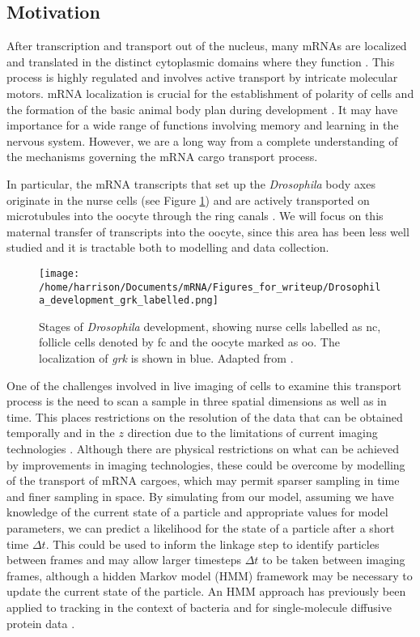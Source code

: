 \documentclass[twocolumn]{biophys}
\begin{document}
\subsection{Motivation}
After transcription and transport out of the nucleus, many mRNAs are localized and translated in the distinct cytoplasmic domains where they function \citep{jansen2001mrna, parton2014subcellular}.
This process is highly regulated and involves active transport by intricate molecular motors.
mRNA localization is crucial for the establishment of polarity of cells and the formation of the basic animal body plan during development \citep{wolpert1998}. 
It may have importance for a wide range of functions involving memory and learning in the nervous system. 
However, we are a long way from a complete understanding of the mechanisms governing the mRNA cargo transport process.

In particular, the mRNA transcripts that set up the \textit{Drosophila} body axes originate in the nurse cells (see Figure \ref{FIG:Drosophila_development}) and are actively transported on microtubules into the oocyte through the ring canals \citep{clark2007dynein}.
We will focus on this maternal transfer of transcripts into the oocyte, since this area has been less well studied and it is tractable both to modelling and data collection.
\begin{figure}[h]
 \centering
 \texttt{[image: /home/harrison/Documents/mRNA/Figures\_for\_writeup/Drosophila\_development\_grk\_labelled.png]}
 \caption{\small Stages of \textit{Drosophila} development, showing nurse cells labelled as nc, follicle cells denoted by fc and the oocyte marked as oo. The localization of \textit{grk} is shown in blue. Adapted from \citet{lasko1999rna}.}
 \label{FIG:Drosophila_development}
\end{figure}

One of the challenges involved in live imaging of cells to examine this transport process is the need to scan a sample in three spatial dimensions as well as in time.
This places restrictions on the resolution of the data that can be obtained temporally and in the $z$ direction due to the limitations of current imaging technologies \citep{weil2010making}.
Although there are physical restrictions on what can be achieved by improvements in imaging technologies, these could be overcome by modelling of the transport of mRNA cargoes, which may permit sparser sampling in time and finer sampling in space.
By simulating from our model, assuming we have knowledge of the current state of a particle and appropriate values for model parameters, we can predict a likelihood for the state of a particle after a short time $\Delta t$.
This could be used to inform the linkage step to identify particles between frames and may allow larger timesteps $\Delta t$ to be taken between imaging frames, although a hidden Markov model (HMM) framework may be necessary to update the current state of the particle.
An HMM approach has previously been applied to tracking in the context of bacteria \citep{rosser2013novel} and for single-molecule diffusive protein data \citep{persson2013extracting}.
\end{document}

